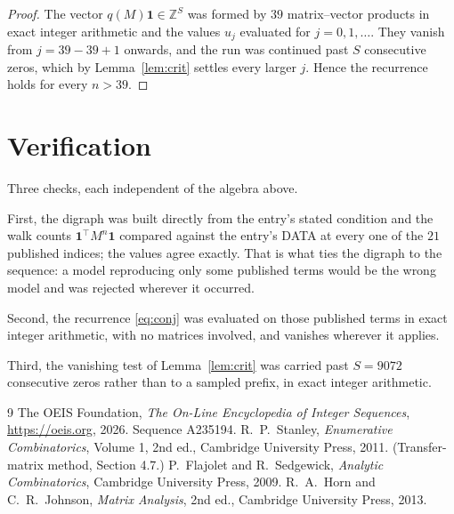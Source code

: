 \documentclass[11pt,a4paper]{article}
\theoremstyle{plain}
\theoremstyle{definition}
\begin{document}
\begin{proof}
The vector $q(M)\mathbf{1}\in\mathbb{Z}^{S}$ was formed by $39$ matrix--vector
products in exact integer arithmetic and the values $u_j$ evaluated for
$j=0,1,\dots$. They vanish from $j=39-39+1$ onwards, and the run was continued past
$S$ consecutive zeros, which by Lemma~\ref{lem:crit} settles every larger $j$. Hence the
recurrence holds for every $n>39$.
\end{proof}

\section{Verification}

Three checks, each independent of the algebra above.

First, the digraph was built directly from the entry's stated condition and the walk counts
$\mathbf{1}^{\!\top}M^{n}\mathbf{1}$ compared against the entry's DATA at every one of
the $21$ published indices; the values agree exactly. That is what ties the digraph to
the sequence: a model reproducing only some published terms would be the wrong model and
was rejected wherever it occurred.

Second, the recurrence \eqref{eq:conj} was evaluated on those published terms in exact
integer arithmetic, with no matrices involved, and vanishes wherever it applies.

Third, the vanishing test of Lemma~\ref{lem:crit} was carried past $S=9072$ consecutive
zeros rather than to a sampled prefix, in exact integer arithmetic.

\begin{thebibliography}{9}
 The OEIS Foundation, \emph{The On-Line Encyclopedia of Integer
Sequences}, \url{https://oeis.org}, 2026. Sequence A235194.
 R.~P.~Stanley, \emph{Enumerative Combinatorics}, Volume 1, 2nd ed.,
Cambridge University Press, 2011. (Transfer-matrix method, Section 4.7.)
 P.~Flajolet and R.~Sedgewick, \emph{Analytic Combinatorics}, Cambridge
University Press, 2009.
 R.~A.~Horn and C.~R.~Johnson, \emph{Matrix Analysis}, 2nd ed., Cambridge
University Press, 2013.
\end{thebibliography}
\end{document}
